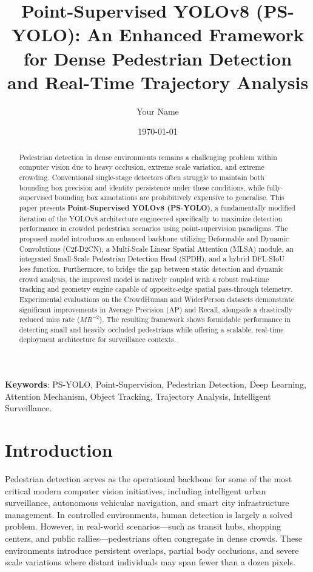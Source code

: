 \documentclass[11pt,a4paper]{article}
\title{Point-Supervised YOLOv8 (PS-YOLO): An Enhanced Framework for Dense Pedestrian Detection and Real-Time Trajectory Analysis}
\author{Your Name}
\date{\today}
\begin{document}
\maketitle

\begin{abstract}
Pedestrian detection in dense environments remains a challenging problem within computer vision due to heavy occlusion, extreme scale variation, and extreme crowding. Conventional single-stage detectors often struggle to maintain both bounding box precision and identity persistence under these conditions, while fully-supervised bounding box annotations are prohibitively expensive to generalise. This paper presents \textbf{Point-Supervised YOLOv8 (PS-YOLO)}, a fundamentally modified iteration of the YOLOv8 architecture engineered specifically to maximize detection performance in crowded pedestrian scenarios using point-supervision paradigms. The proposed model introduces an enhanced backbone utilizing Deformable and Dynamic Convolutions (C2f-D2CN), a Multi-Scale Linear Spatial Attention (MLSA) module, an integrated Small-Scale Pedestrian Detection Head (SPDH), and a hybrid DFL-SIoU loss function. Furthermore, to bridge the gap between static detection and dynamic crowd analysis, the improved model is natively coupled with a robust real-time tracking and geometry engine capable of opposite-edge spatial pass-through telemetry. Experimental evaluations on the CrowdHuman and WiderPerson datasets demonstrate significant improvements in Average Precision (AP) and Recall, alongside a drastically reduced miss rate ($MR^{-2}$). The resulting framework shows formidable performance in detecting small and heavily occluded pedestrians while offering a scalable, real-time deployment architecture for surveillance contexts.
\end{abstract}

\noindent \textbf{Keywords}: PS-YOLO, Point-Supervision, Pedestrian Detection, Deep Learning, Attention Mechanism, Object Tracking, Trajectory Analysis, Intelligent Surveillance.

\section{Introduction}
Pedestrian detection serves as the operational backbone for some of the most critical modern computer vision initiatives, including intelligent urban surveillance, autonomous vehicular navigation, and smart city infrastructure management. In controlled environments, human detection is largely a solved problem. However, in real-world scenarios---such as transit hubs, shopping centers, and public rallies---pedestrians often congregate in dense crowds. These environments introduce persistent overlaps, partial body occlusions, and severe scale variations where distant individuals may span fewer than a dozen pixels.
\end{document}
